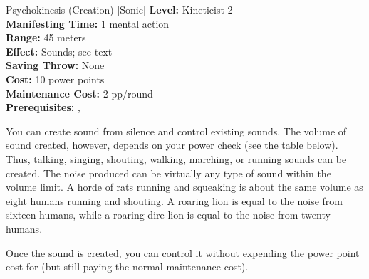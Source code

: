 {Psychokinesis (Creation) [Sonic]}
{
	\textbf{Level:}
	Kineticist 2\\
	\textbf{Manifesting Time:}
	1 mental action\\
	\textbf{Range:}
	45 meters\\
	\textbf{Effect:}
	Sounds; see text\\
	\textbf{Saving Throw:}
	None\\
	\textbf{Cost:}
	10 power points\\
	\textbf{Maintenance Cost:}
	2 pp/round\\
	\textbf{Prerequisites:}
	, \\
}
{
	You can create sound from silence and control existing sounds. The volume of sound created, however, depends on your power check (see the table below). Thus, talking, singing, shouting, walking, marching, or running sounds can be created. The noise produced can be virtually any type of sound within the volume limit. A horde of rats running and squeaking is about the same volume as eight humans running and shouting. A roaring lion is equal to the noise from sixteen humans, while a roaring dire lion is equal to the noise from twenty humans.


	Once the sound is created, you can control it without expending the power point cost for  (but still paying the normal maintenance cost).
}